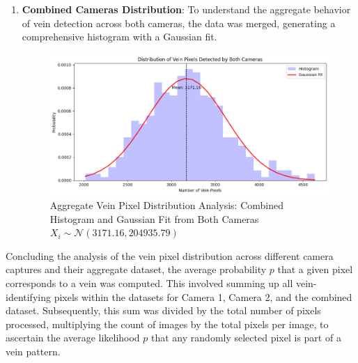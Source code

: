 \begin{enumerate}
    \newpage
    \item \textbf{Combined Cameras Distribution}: To understand the aggregate behavior of vein detection across both cameras, the data was merged, generating a comprehensive histogram with a Gaussian fit.

    \begin{figure}[H]
        \centering
        \includegraphics[width=1\linewidth]{latex-img/distribution_veins_bothcams.png}
        \caption{Aggregate Vein Pixel Distribution Analysis: Combined Histogram and Gaussian Fit from Both Cameras \(X_i \sim \mathcal{N}(3171.16, 204935.79)\)}
        \label{distribution_veins_bothcams}
    \end{figure}

\end{enumerate}

Concluding the analysis of the vein pixel distribution across different camera captures and their aggregate dataset, the average probability \(p\) that a given pixel corresponds to a vein was computed. This involved summing up all vein-identifying pixels within the datasets for Camera 1, Camera 2, and the combined dataset. Subsequently, this sum was divided by the total number of pixels processed, multiplying the count of images by the total pixels per image, to ascertain the average likelihood \(p\) that any randomly selected pixel is part of a vein pattern.

